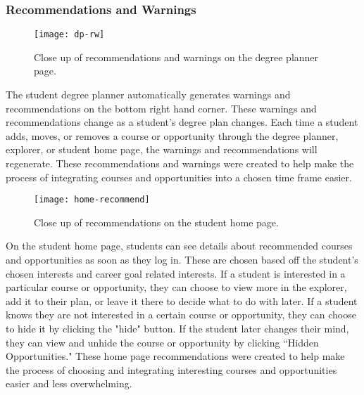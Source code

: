 \subsubsection{Recommendations and Warnings}
\begin{figure}[htbp!]
\centering
\texttt{[image: dp-rw]}
\caption{Close up of recommendations and warnings on the degree planner page.}
\end{figure}

The student degree planner automatically generates warnings and recommendations on the bottom right hand corner. These warnings and recommendations change as a student's degree plan changes. Each time a student adds, moves, or removes a course or opportunity through the degree planner, explorer, or student home page, the warnings and recommendations will regenerate. These recommendations and warnings were created to help make the process of integrating courses and opportunities into a chosen time frame easier.

\begin{figure}[htbp!]
\centering
\texttt{[image: home-recommend]}
\caption{Close up of recommendations on the student home page.}
\end{figure}

On the student home page, students can see details about recommended courses and opportunities as soon as they log in. These are chosen based off the student's chosen interests and career goal related interests. If a student is interested in a particular course or opportunity, they can choose to view more in the explorer, add it to their plan, or leave it there to decide what to do with later. If a student knows they are not interested in a certain course or opportunity, they can choose to hide it by clicking the "hide" button. If the student later changes their mind, they can view and unhide the course or opportunity by clicking ``Hidden Opportunities." These home page recommendations were created to help make the process of choosing and integrating interesting courses and opportunities easier and less overwhelming.

